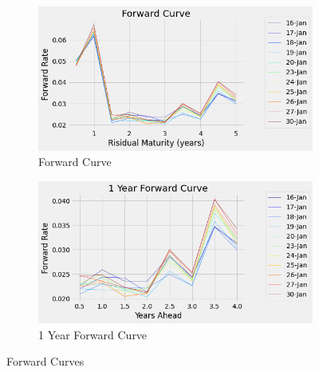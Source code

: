 \documentclass{article}
\begin{document}
\begin{enumerate}
\begin{enumerate}
            \begin{figure}[H]
            \begin{subfigure}{0.5\textwidth}
            \includegraphics[width=\linewidth]{forward_curve.png}
            \caption{Forward Curve}
            \end{subfigure}
            \begin{subfigure}{0.5\textwidth}
            \includegraphics[width=\linewidth]{forward_curve_1.png}
            \caption{1 Year Forward Curve}
            \end{subfigure}
            \caption{Forward Curves}
            \label{fig:Forward Curves}
            \end{figure}


\end{enumerate}
\end{enumerate}
\end{document}
